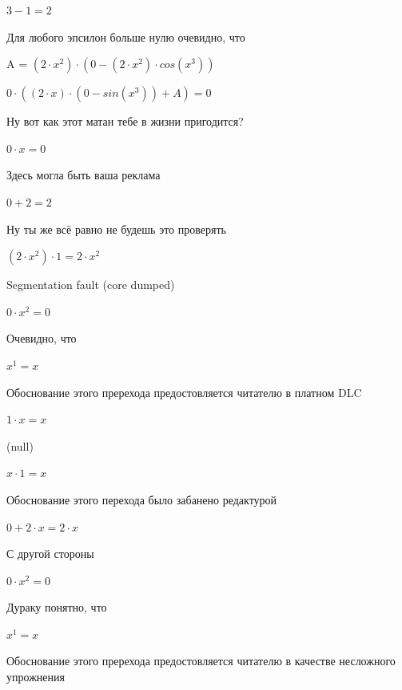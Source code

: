 \documentclass[12pt,a4paper,fleqn]{article}
\begin{document}
\begin{center}$3-1 = 2$\end{center}
Для любого эпсилон больше нулю очевидно, что

\begin{center}
A = $(2 \cdot x^{2}) \cdot (0-(2 \cdot x^{2}) \cdot cos(x^{3}))$\end{center}
\begin{center}
$0 \cdot ((2 \cdot x) \cdot (0-sin(x^{3}))+A) = 0$\end{center}
Ну вот как этот матан тебе в жизни пригодится?

\begin{center}
$0 \cdot x = 0$\end{center}
Здесь могла быть ваша реклама

\begin{center}
$0+2 = 2$\end{center}
Ну ты же всё равно не будешь это проверять

\begin{center}
$(2 \cdot x^{2}) \cdot 1 = 2 \cdot x^{2}$\end{center}
Segmentation fault (core dumped)

\begin{center}
$0 \cdot x^{2} = 0$\end{center}
Очевидно, что

\begin{center}
$x^{1} = x$\end{center}
Обоснование этого пререхода предостовляется читателю в платном DLC

\begin{center}
$1 \cdot x = x$\end{center}
(null)\cite{link4}

\begin{center}
$x \cdot 1 = x$\end{center}
Обоснование этого перехода было забанено редактурой

\begin{center}
$0+2 \cdot x = 2 \cdot x$\end{center}
С другой стороны

\begin{center}
$0 \cdot x^{2} = 0$\end{center}
Дураку понятно, что

\begin{center}
$x^{1} = x$\end{center}
Обоснование этого пререхода предостовляется читателю в качестве несложного упрожнения
\end{document}
